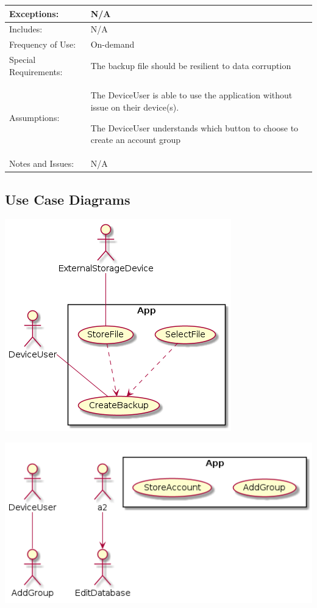 \documentclass[stu]{apa7}
\newcommand{\nextitem}{\par\hspace*{\labelsep}\textbullet\hspace*{\labelsep}}
\begin{document}
{{\begin{xltabular}{\textwidth}{|l|X|}
  Exceptions: &
                N/A
              \\ \hline
  Includes: & N/A \\ \hline

  Frequency of Use: & On-demand \\ \hline

  Special Requirements: & \nextitem The backup file should be resilient to data corruption \\ \hline

  Assumptions: & \nextitem The DeviceUser is able to use the application without issue on their device(s). \nextitem The DeviceUser understands which button to choose to create an account group \\ \hline

  Notes and Issues: & N/A \\ \hline

\end{xltabular}

\subsection{Use Case Diagrams}

\includegraphics[scale=0.5]{diag/gt/uc1.png}

\includegraphics[scale=0.5]{diag/gt/uc2.png}

}}
\end{document}
